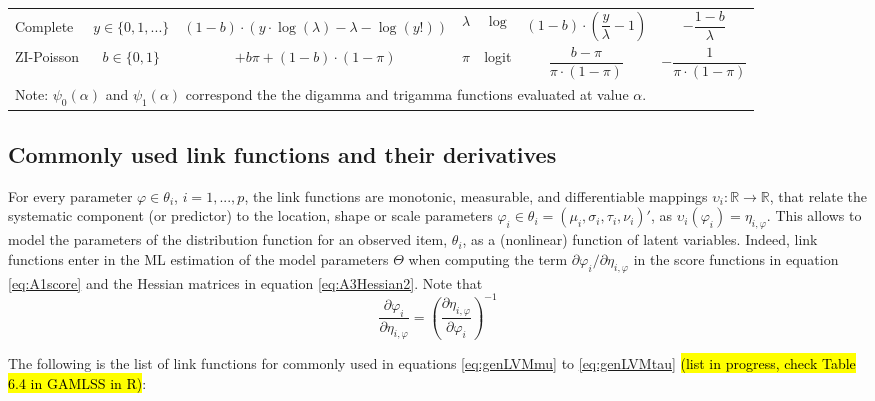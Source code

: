 \documentclass[11pt, a4paper]{article}
\newcommand{\R}{{\ensuremath{\mathbb{R}}}}
\begin{document}
\begin{table}[h!]
{{\begin{tabular}{lcccccc}
& & & \multirow{2}{*}{$\lambda$} & \multirow{2}{*}{$\log$} & \multirow{2}{*}{$(1-b)\cdot \left(\dfrac{y}{\lambda}-1\right)$} & \multirow{2}{*}{$-\dfrac{1-b}{\lambda}$} \\ Complete & \multirow{1}{*}{$y \in \{0,1,...\}$} & \multirow{1}{*}{$(1-b)\cdot\left(y\cdot\log(\lambda) - \lambda - \log(y!)\right)$} & & & & \\ ZI-Poisson & $b \in \{0,1\}$ & \multirow{1}{*}{$+ b\pi + (1-b)\cdot(1-\pi)$}  & \multirow{2}{*}{$\pi$} & \multirow{2}{*}{logit} & \multirow{2}{*}{$\dfrac{b - \pi}{\pi \cdot (1-\pi)}$} & \multirow{2}{*}{$-\dfrac{1}{\pi \cdot (1-\pi)}$} \\ & & & & & & \\[5pt] \hline \hline
\multicolumn{7}{l}{\scriptsize{Note: $\psi_0(\alpha)$ and $\psi_1(\alpha)$ correspond the the digamma and trigamma functions evaluated at value $\alpha$.}}
\end{tabular}%
} %
} %
\label{tab:A0funs}
\end{table}


\subsection{Commonly used link functions and their derivatives} \label{sec:AppLink}

For every parameter $\varphi \in \theta_i$, $i=1,...,p$, the link functions are monotonic, measurable, and differentiable mappings $\upsilon_i:\R \to \R$, that relate the systematic component (or predictor) to the location, shape or scale parameters $\varphi_i \in \theta_i = (\mu_i, \sigma_i, \tau_i, \nu_i)'$, as  $\upsilon_i(\varphi_i) = \eta_{i,\varphi}$. This allows to model the parameters of the distribution function for an observed item, $\theta_i$, as a (nonlinear) function of latent variables. Indeed, link functions enter in the ML estimation of the model parameters $\Theta$ when computing the term $\partial \varphi_i / \partial \eta_{i,\varphi}$ in the score functions in equation \eqref{eq:A1score} and the Hessian matrices in equation \eqref{eq:A3Hessian2}. Note that
\begin{equation*}
\frac{\partial \varphi_i}{\partial \eta_{i,\varphi}} = \left( \frac{\partial \eta_{i,\varphi}}{\partial \varphi_i}\right)^{-1}
\end{equation*}

The following is the list of link functions for commonly used in equations \eqref{eq:genLVMmu} to \eqref{eq:genLVMtau} \hl{(list in progress, check Table 6.4 in GAMLSS in R)}:
\end{document}
